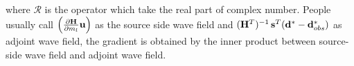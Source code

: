 \documentclass[revised,endfloat]{geophysics}
\begin{document}
where ${\mathcal R}$ is the operator which take the real part of complex number. People usually call $\left( \frac{\partial {\bf H}}{\partial m_l} {\bf u} \right)$ as the source side wave field and $({\bf H}^T)^{-1} \,    {\bf s}^T ({\bf d}^* - {\bf d}_{obs}^*)$ as adjoint wave field, the gradient is obtained by the inner product between source-side wave field and adjoint wave field.
 
%
%
\end{document}
